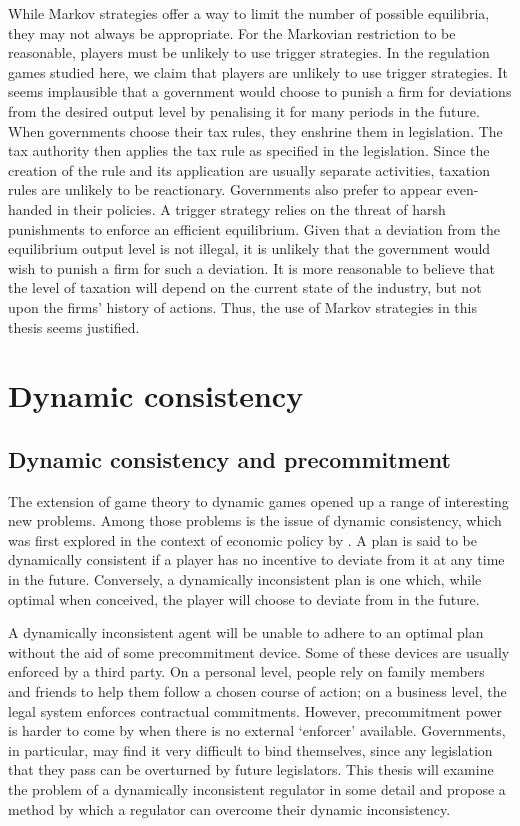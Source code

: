 While Markov strategies offer a way to limit the number of possible
equilibria, they may not always be appropriate. For the Markovian
restriction to be reasonable, players must be unlikely to use trigger
strategies. In the regulation games studied here, we claim that players are
unlikely to use trigger strategies. It seems implausible that a government
would choose to punish a firm for deviations from the desired output level
by penalising it for many periods in the future. When governments choose
their tax rules, they enshrine them in legislation. The tax authority then
applies the tax rule as specified in the legislation. Since the creation of
the rule and its application are usually separate activities, taxation rules
are unlikely to be reactionary. Governments also prefer to appear
even-handed in their policies. A trigger strategy relies on the threat of
harsh punishments to enforce an efficient equilibrium. Given that a
deviation from the equilibrium output level is not illegal, it is unlikely
that the government would wish to punish a firm for such a deviation. It is
more reasonable to believe that the level of taxation will depend on the
current state of the industry, but not upon the firms' history of actions.
Thus, the use of Markov strategies in this thesis seems justified.

\section{Dynamic consistency}

\label{sec:dynamic-consistency}

\subsection{Dynamic consistency and precommitment}

\label{sec:dynam-cons-prec} The extension of game theory to dynamic games
opened up a range of interesting new problems. Among those problems is the
issue of dynamic consistency, which was first explored in the context of
economic policy by \citet{Kydland1977}. A plan is said to be dynamically
consistent if a player has no incentive to deviate from it at any time in
the future. Conversely, a dynamically inconsistent plan is one which, while
optimal when conceived, the player will choose to deviate from in the future.

A dynamically inconsistent agent will be unable to adhere to an optimal plan
without the aid of some precommitment device. Some of these devices are
usually enforced by a third party. On a personal level, people rely on
family members and friends to help them follow a chosen course of action; on
a business level, the legal system enforces contractual commitments.
However, precommitment power is harder to come by when there is no external
`enforcer' available. Governments, in particular, may find it very difficult
to bind themselves, since any legislation that they pass can be overturned
by future legislators. This thesis will examine the problem of a dynamically
inconsistent regulator in some detail and propose a method by which a
regulator can overcome their dynamic inconsistency.

